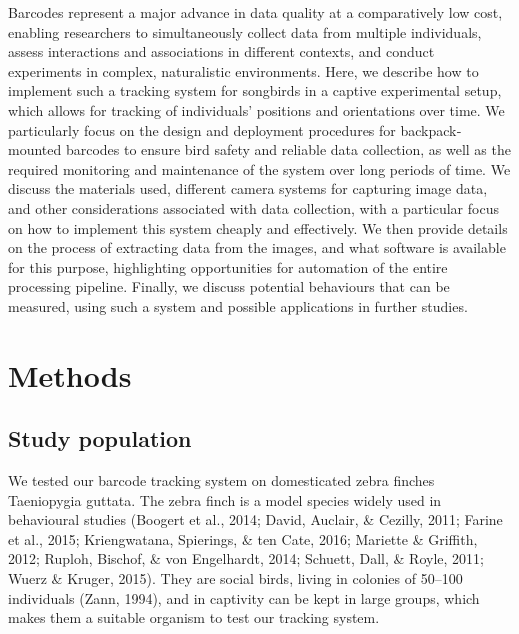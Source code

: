 \documentclass[11pt,a4paper,twoside]{book}
\begin{document}
\begin{doublespace}
    Barcodes represent a major advance in data quality at a comparatively low cost, enabling researchers to simultaneously collect data from multiple individuals, assess interactions and associations in different contexts, and conduct experiments in complex, naturalistic environments. Here, we describe how to implement such a tracking system for songbirds in a captive experimental setup, which allows for tracking of individuals’ positions and orientations over time. We particularly focus on the design and deployment procedures for backpack‐mounted barcodes to ensure bird safety and reliable data collection, as well as the required monitoring and maintenance of the system over long periods of time. We discuss the materials used, different camera systems for capturing image data, and other considerations associated with data collection, with a particular focus on how to implement this system cheaply and effectively. We then provide details on the process of extracting data from the images, and what software is available for this purpose, highlighting opportunities for automation of the entire processing pipeline. Finally, we discuss potential behaviours that can be measured, using such a system and possible applications in further studies.

\section{Methods}
\subsection{Study population}
We tested our barcode tracking system on domesticated zebra finches Taeniopygia guttata. The zebra finch is a model species widely used in behavioural studies (Boogert et al., 2014; David, Auclair, \& Cezilly, 2011; Farine et al., 2015; Kriengwatana, Spierings, \& ten Cate, 2016; Mariette & Griffith, 2012; Ruploh, Bischof, \& von Engelhardt, 2014; Schuett, Dall, \& Royle, 2011; Wuerz & Kruger, 2015). They are social birds, living in colonies of 50–100 individuals (Zann, 1994), and in captivity can be kept in large groups, which makes them a suitable organism to test our tracking system.


\end{doublespace}
\end{document}
